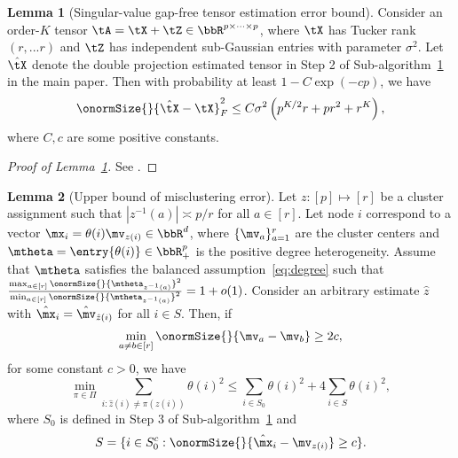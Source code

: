 \documentclass[lettersize,onecolumn,journal]{IEEEtran}
\theoremstyle{definition}
\newtheorem{lem}{Lemma}
\theoremstyle{definition}
\newcommand{\of}[1]{\left(#1\right)}
\begin{document}
\begin{lem}[Singular-value gap-free tensor estimation error bound]\label{lem:two-step_esterror}Consider an order-$K$ tensor $\tA = \tX + \tZ \in \bbR^{p \times \cdots \times p}$, where $\tX$ has Tucker rank $(r,...r)$ and $\tZ$ has independent sub-Gaussian entries with parameter $\sigma^2$. Let $\hat \tX$ denote the double projection estimated tensor in Step 2 of Sub-algorithm~\hyperref[alg:main]{1} in the main paper. Then with probability at least $1 - C \exp\of{- cp }$, we have
\begin{align}
    \onormSize{}{\hat \tX - \tX}_F^2 \leq C \sigma^2 \of{ p^{K/2}r + pr^2 + r^K },
\end{align}
where $C, c$ are some positive constants.
\end{lem}

\begin{proof}[Proof of Lemma~\ref{lem:two-step_esterror}]
See \citet[Proposition 1]{han2020exact}.
\end{proof}

\begin{lem}[Upper bound of misclustering error]\label{lem:upper_mis} Let $z: [p] \mapsto [r]$ be a cluster assignment such that $|z^{-1}(a)| \asymp p/r$ for all $a \in [r]$. Let node $i$ correspond to a vector $\mx_i  = \theta(i) \mv_{z(i)} \in \bbR^d$, where $\{\mv_a\}_{a = 1}^r$ are the cluster centers and $\mtheta = \entry{\theta(i)} \in \bbR^p_+$ is the positive degree heterogeneity.  Assume that  $\mtheta$ satisfies the balanced assumption~\eqref{eq:degree} such that ${\max_{a \in [r]} \onormSize{}{\mtheta_{z^{-1}(a)}}^2 \over \min_{a \in [r]} \onormSize{}{\mtheta_{z^{-1}(a)}}^2 }= 1 + o(1)$. Consider an arbitrary estimate $\hat z$ with $\hat \mx_i = \hat \mv_{\hat z(i)}$ for all $ i \in S$. Then, if
\begin{equation}\label{eq:upper_mis_cond}
    \min_{a \neq b \in [r]} \onormSize{}{\mv_a - \mv_b} \geq 2c,
\end{equation}
 for some constant $c >0$, we have 
\begin{equation}
    \min_{\pi \in \Pi} \sum_{i : \hat z(i) \neq \pi(z(i))} \theta(i)^2 \leq \sum_{i \in S_0} \theta(i)^2 + 4 \sum_{i \in S} \theta(i)^2,
\end{equation}
where $S_0$ is defined in Step 3 of Sub-algorithm~\hyperref[alg:main]{1} and
\begin{equation}
   S = \{i \in S_0^c: \onormSize{}{\hat \mx_i - \mv_{z(i)} } \geq c \}.
\end{equation}

\end{lem}
\end{document}
